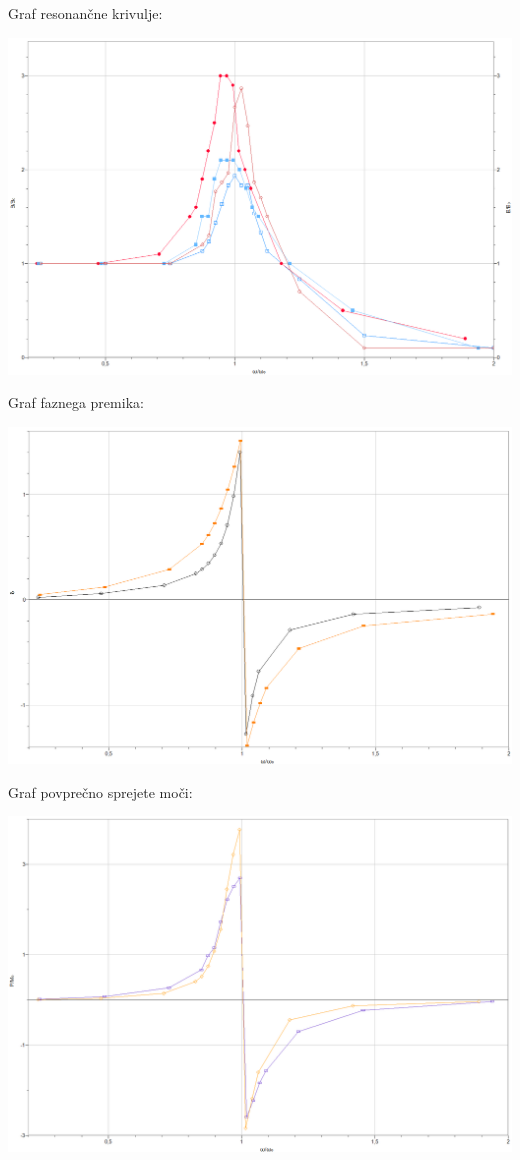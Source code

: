 \documentclass[a4paper]{report}
\begin{document}
\noindent Graf resonančne krivulje: \newline

\includegraphics[width=\textwidth]{Resonanca}

\pagebreak
\noindent Graf faznega premika:\newline

\includegraphics[width=\textwidth]{Fazni zamik}

\noindent Graf povprečno sprejete moči: \newline

\includegraphics[width=\textwidth]{Prejeta moč}
\end{document}
